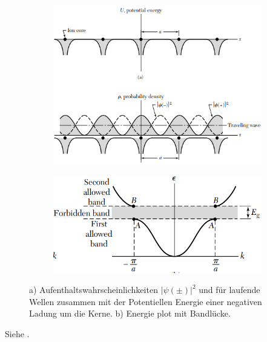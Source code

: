 \begin{figure}[H]
    \centering
    \begin{subfigure}[c]{0.4\textwidth}
        \includegraphics[width=\linewidth]{resources/15-06-2015/q37a.png}
        \caption{}
    \end{subfigure}%
    \begin{subfigure}[c]{0.4\textwidth}
        \includegraphics[width=\textwidth]{resources/15-06-2015/q37b.png}
        \caption{}
    \end{subfigure}%
    \caption{
        a) Aufenthaltswahrscheinlichkeiten $\left|\psi(\pm)\right|^2$ und für laufende Wellen zusammen mit der Potentiellen Energie einer negativen Ladung um die Kerne.
        b) Energie plot mit Bandlücke.
        }
\end{figure}

\label{q:38}

Siehe .

